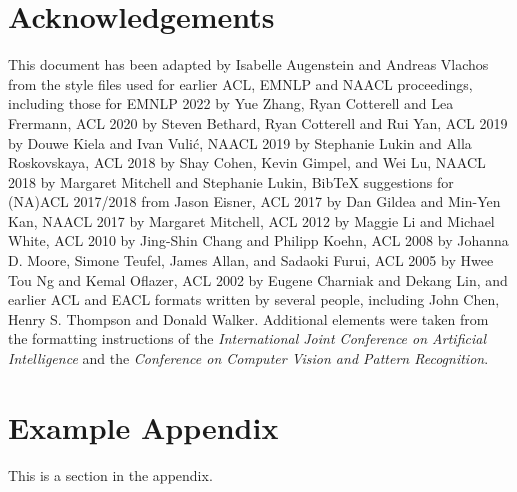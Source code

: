 \documentclass[11pt]{article}
\begin{document}
\section*{Acknowledgements}
This document has been adapted by Isabelle Augenstein and Andreas Vlachos from the style files used for earlier ACL, EMNLP and NAACL proceedings, including those for
EMNLP 2022 by Yue Zhang, Ryan Cotterell and Lea Frermann,
ACL 2020 by Steven Bethard, Ryan Cotterell and Rui Yan,
ACL 2019 by Douwe Kiela and Ivan Vuli\'{c},
NAACL 2019 by Stephanie Lukin and Alla Roskovskaya, 
ACL 2018 by Shay Cohen, Kevin Gimpel, and Wei Lu, 
NAACL 2018 by Margaret Mitchell and Stephanie Lukin,
Bib\TeX{} suggestions for (NA)ACL 2017/2018 from Jason Eisner,
ACL 2017 by Dan Gildea and Min-Yen Kan, NAACL 2017 by Margaret Mitchell, 
ACL 2012 by Maggie Li and Michael White, 
ACL 2010 by Jing-Shin Chang and Philipp Koehn, 
ACL 2008 by Johanna D. Moore, Simone Teufel, James Allan, and Sadaoki Furui, 
ACL 2005 by Hwee Tou Ng and Kemal Oflazer, 
ACL 2002 by Eugene Charniak and Dekang Lin, 
and earlier ACL and EACL formats written by several people, including
John Chen, Henry S. Thompson and Donald Walker.
Additional elements were taken from the formatting instructions of the \emph{International Joint Conference on Artificial Intelligence} and the \emph{Conference on Computer Vision and Pattern Recognition}.




\appendix

\section{Example Appendix}
\label{sec:appendix}

This is a section in the appendix.
\end{document}
